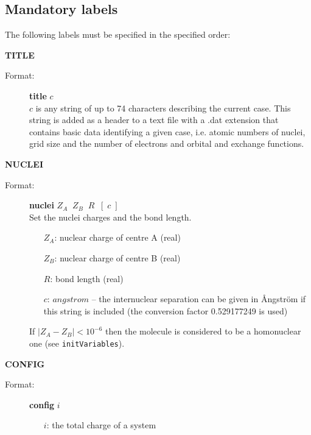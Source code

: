 \documentclass[10pt,a4paper]{article}
\newcommand{\ft}[1]{\texttt{#1}}
\begin{document}
\noindent
\subsection{Mandatory labels}

The following labels must be specified in the specified order:
\begin{description}
\item \textbf{TITLE}
\begin{description}
\item[Format:] \textbf{title} $c$ \\ $c$ is any string of up to 74
  characters describing the current case. This string is added as a
  header to a text file with a .dat extension that contains basic data
  identifying a given case, i.e. atomic numbers of nuclei, grid size
  and the number of electrons and orbital and exchange functions.
\end{description}

\item \textbf{NUCLEI}
\begin{description}
\item[Format:] \textbf{nuclei} $Z_A \;\;Z_B\;\; R \;\;[\; c\;]$ \\
  Set the nuclei charges and the bond length.

\begin{itemize}
\item[$Z_A$:] nuclear charge of centre A (real)
\item[$Z_B$:] nuclear charge of centre B (real)
\item[$R$:] bond length (real)
\item[$c$:] $angstrom$ -- the internuclear separation can be given in
  \AA{}ngstr\"om if this string is included (the conversion factor
  0.529177249 is used)
\end{itemize}
  If $|Z_A-Z_B|<10^{-6}$ then the molecule is considered to be a
  homonuclear one (see \ft{initVariables}).
\end{description}

\item \textbf{CONFIG}
\begin{description}
\item[Format:] \textbf{config} $i$
\begin{itemize}
\item[$i$:] the total charge of a system
\end{itemize}
\end{description}


\end{description}
\end{document}
